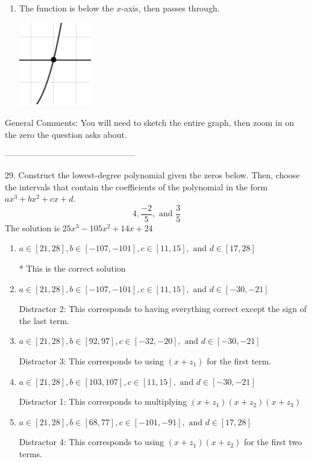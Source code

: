 \documentclass{article}[10pt]
\begin{document}
\begin{enumerate}[label=\Alph*.]
\item The function is below the $x$-axis, then passes through. 
\begin{center}\includegraphics[scale=0.5]{../Figures/zeroBehaviorPositiveOdd.png}\end{center} 
 
\end{enumerate} 
 
General Comments: You will need to sketch the entire graph, then zoom in on the zero the question asks about.

-----------------------------------------------

29. Construct the lowest-degree polynomial given the zeros below. Then, choose the intervals that contain the coefficients of the polynomial in the form $ax^3+bx^2+cx+d$.
$$ 4, \frac{-2}{5}, \text{ and } \frac{3}{5} $$ 
The solution is $ 25 x^3 - 105 x^2 + 14 x + 24 $ 

\begin{enumerate}[label=\Alph*.] 
\item $ a \in [21, 28], b \in [-107, -101], c \in [11, 15], \text{ and } d \in [17, 28] $ 

 * This is the correct solution 
\item $ a \in [21, 28], b \in [-107, -101], c \in [11, 15], \text{ and } d \in [-30, -21] $ 

  Distractor 2: This corresponds to having everything correct except the sign of the last term. 
\item $ a \in [21, 28], b \in [92, 97], c \in [-32, -20], \text{ and } d \in [-30, -21] $ 

  Distractor 3: This corresponds to using $(x+z_1)$ for the first term. 
\item $ a \in [21, 28], b \in [103, 107], c \in [11, 15], \text{ and } d \in [-30, -21] $ 

  Distractor 1: This corresponds to multiplying $(x+z_1)(x+z_2)(x+z_3)$ 
\item $ a \in [21, 28], b \in [68, 77], c \in [-101, -91], \text{ and } d \in [17, 28] $ 

  Distractor 4: This corresponds to using $(x+z_1)(x+z_2)$ for the first two terms. 
\end{enumerate} 
 
\end{document}
